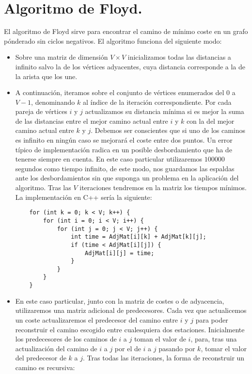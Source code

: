 \documentclass[spanish, a4paper, 12pt] {article}
\begin{document}
\section{Algoritmo de Floyd.}
El algoritmo de Floyd sirve para encontrar el camino de mínimo coste en un grafo pónderado sin ciclos negativos. El algoritmo funciona del siguiente modo:
\begin{itemize}
\item{
Sobre una matriz de dimensión $V\times V$ inicializamos todas las distancias a infinito salvo la de los vértices adyacentes, cuya distancia corresponde a la de la arista que los une.
}
\item{
A continuación, iteramos sobre el conjunto de vértices enumerados del $0$ a $V - 1$, denominando $k$ al índice de la iteración correspondiente. Por cada pareja de vértices $i$ y $j$ actualizamos su distancia mínima si es mejor la suma de las distancias entre el mejor camino actual entre $i$ y $k$ con la del mejor camino actual entre $k$ y $j$. Debemos ser conscientes que si uno de los caminos es infinito en ningún caso se mejorará el coste entre dos puntos. Un error típico de implementación radica en un posible desbordamiento que ha de tenerse siempre en cuenta.
En este caso particular utilizaremos $100000$ segundos como tiempo infinito, de este modo, nos guardamos las espaldas ante los desbordamientos sin que suponga un problema en la aplicación del algoritmo. Tras las $V$ iteraciones tendremos en la matriz los tiempos mínimos. La implementación en C++ sería la siguiente:
\begin{verbatim}
    for (int k = 0; k < V; k++) {
        for (int i = 0; i < V; i++) {
            for (int j = 0; j < V; j++) {
                int time = AdjMat[i][k] + AdjMat[k][j];
                if (time < AdjMat[i][j]) {
                    AdjMat[i][j] = time;
                }
            }
        }
    }
\end{verbatim}
}
\item{
En este caso particular, junto con la matriz de costes o de adyacencia, utilizaremos una matriz adicional de predecesores. Cada vez que actualicemos un coste actualizaremos el predecesor del camino entre $i$ y $j$ para poder reconstruir el camino escogido entre cualesquiera dos estaciones. Inicialmente los predecesores de los caminos de $i$ a $j$ toman el valor de $i$, para, tras una actualización del camino de $i$ a $j$ por el de $i$ a $j$ pasando por $k$, tomar el valor del predecesor de $k$ a $j$. Tras todas las iteraciones, la forma de reconstruir un camino es recursiva:
}
\end{itemize}
\end{document}
